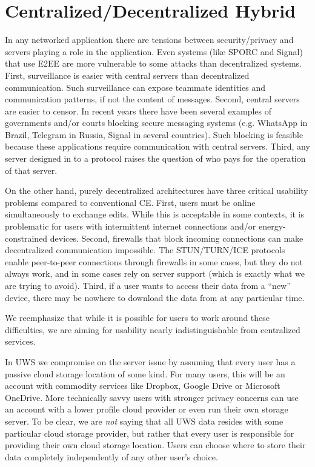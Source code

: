 \documentclass[runningheads]{llncs}
\begin{document}
\section{Centralized{\slash}Decentralized Hybrid}

In any networked application there are tensions between security{\slash}privacy and servers playing a role in the application.
Even systems (like SPORC and Signal) that use E2EE are more vulnerable to some attacks than decentralized systems.
First, surveillance is easier with central servers than decentralized communication.
Such surveillance can expose teammate identities and communication patterns, if not the content of messages.
Second, central servers are easier to censor.
In recent years there have been several examples of governments and{\slash}or courts blocking secure messaging systems (e.g. WhatsApp in Brazil, Telegram in Russia, Signal in several countries).
Such blocking is feasible because these applications require communication with central servers.
Third, any server designed in to a protocol raises the question of who pays for the operation of that server.

On the other hand, purely decentralized architectures have three critical usability problems compared to conventional CE.
First, users must be online simultaneously to exchange edits\footnotemark{}.
While this is acceptable in some contexts, it is problematic for users with intermittent internet connections and{\slash}or energy-constrained devices.
Second, firewalls that block incoming connections can make decentralized communication impossible.
The STUN{\slash}TURN{\slash}ICE protocols enable peer-to-peer connections through firewalls in some cases, but they do not always work, and in some cases rely on server support (which is exactly what we are trying to avoid).
Third, if a user wants to access their data from a ``new'' device, there may be nowhere to download the data from at any particular time.


We reemphasize that while it is possible for users to work around these difficulties, we are aiming for usability nearly indistinguishable from centralized services.

In UWS we compromise on the server issue by assuming that every user has a passive cloud storage location of some kind.
For many users, this will be an account with commodity services like Dropbox, Google Drive or Microsoft OneDrive.
More technically savvy users with stronger privacy concerns can use an account with a lower profile cloud provider or even run their own storage server.
To be clear, we are \emph{not} saying that all UWS data resides with some particular cloud storage provider, but rather that every user is responsible for providing their own cloud storage location.
Users can choose where to store their data completely independently of any other user's choice.
\end{document}
